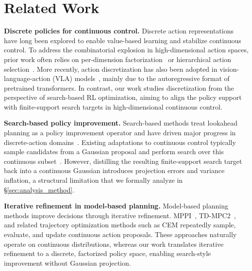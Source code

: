 \section{Related Work}

\textbf{Discrete policies for continuous control.}
Discrete action representations have long been explored to enable value-based learning and stabilize continuous control. To address the combinatorial explosion in high-dimensional action spaces, prior work often relies on per-dimension factorization~\citep{tavakoli2018action, tang2020discretizing} or hierarchical action selection~\citep{mao2020poly, seo2024coarse}. More recently, action discretization has also been adopted in vision-language-action (VLA) models~\citep{brohan2022rt, zitkovich2023rt, kim2024openvla, liu2026oat}, mainly due to the autoregressive format of pretrained transformers. In contrast, our work studies discretization from the perspective of search-based RL optimization, aiming to align the policy support with finite-support search targets in high-dimensional continuous control.

\textbf{Search-based policy improvement.}
Search-based methods treat lookahead planning as a policy improvement operator and have driven major progress in discrete-action domains~\citep{silver2017mastering, schrittwieser2020mastering, ye2021mastering, danihelka2022policy}. Existing adaptations to continuous control typically sample candidates from a Gaussian proposal and perform search over this continuous subset~\citep{hubert2021learning, wang2024efficientzero}. However, distilling the resulting finite-support search target back into a continuous Gaussian introduces projection errors and variance inflation, a structural limitation that we formally analyze in \S\ref{sec:analysis_method}.

\textbf{Iterative refinement in model-based planning.}
Model-based planning methods improve decisions through iterative refinement. MPPI~\citep{williams2017information}, TD-MPC2~\citep{hansen2023td}, and related trajectory optimization methods such as CEM repeatedly sample, evaluate, and update continuous action proposals. These approaches naturally operate on continuous distributions, whereas our work translates iterative refinement to a discrete, factorized policy space, enabling search-style improvement without Gaussian projection.